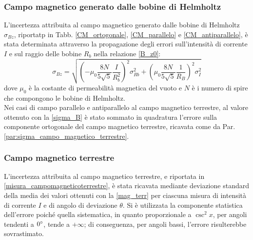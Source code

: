 \documentclass[]{article}
\begin{document}
    \subsubsection{Campo magnetico generato dalle bobine di Helmholtz}
    L'incertezza attribuita al campo magnetico generato dalle bobine di Helmholtz $\sigma _{Bz} $, riportatp in Tabb. \ref{CM_ortogonale}, \ref{CM_parallelo} e \ref{CM_antiparallelo}, è stata determinata attraverso la propagazione degli errori sull'intensità di corrente $I$ e sul raggio delle bobine $R_b$ nella relazione \ref{B_z0}:
    \begin{equation}
        \label{sigma_B}
        \sigma _{Bz} = \sqrt{\left(- \mu _0 \frac{8 N}{5\sqrt{5}} \frac{I}{R_b^2}\right)^2 \sigma_{Rb}^2 + \left(\mu _0 \frac{8 N}{5\sqrt{5}} \frac{1}{R_B} \right)^2 \sigma _I ^2} 
    \end{equation}
    dove $\mu _0 $ è la costante di permeabilità magnetica del vuoto e $N$ è i numero di spire che compongono le bobine di Helmholtz. \\
    Nei casi di campo parallelo e antiparallelo al campo magnetico terrestre, al valore ottenuto con la \ref{sigma_B} è stato sommato in quadratura l'errore sulla componente ortogonale del campo magnetico terrestre, ricavata come da Par. \ref{par:sigma_campo_magnetico_terrestre}.


    \subsubsection{Campo magnetico terrestre}
    L'incertezza attribuita al campo magnetico terrestre, e riportata in \ref{misura_campomagneticoterrestre}, è stata ricavata mediante deviazione standard della media dei valori ottenuti con la \ref{mag_terr} per ciascuna misura di intensità di corrente $I$ e di angolo di deviazione $\theta$. Si è utilizzata la componente statistica dell'errore poiché quella sistematica, in quanto proporzionale a $\csc^2{x}$, per angoli tendenti a $0 \degree $, tende a $+ \infty $; di conseguenza, per angoli bassi, l'errore risulterebbe sovrastimato.

    \label{par:sigma_campo_magnetico_terrestre}
\end{document}
